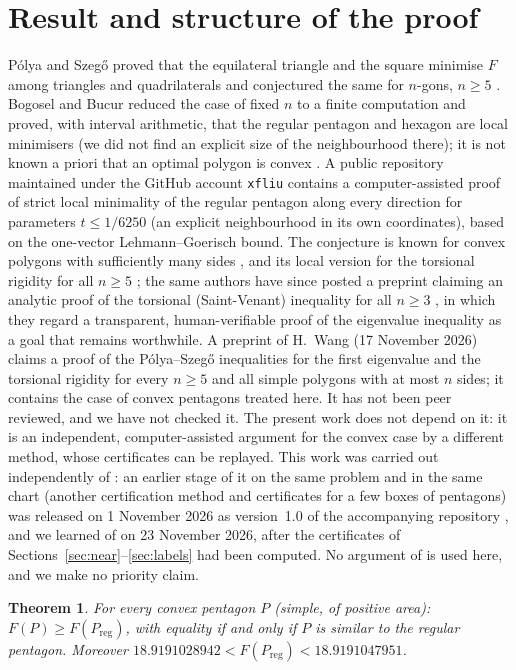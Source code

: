 \documentclass[11pt]{article}
\newtheorem{theorem}{Theorem}
\theoremstyle{remark}
\begin{document}
\section{Result and structure of the proof}
P\'olya and Szeg\H{o} proved that the equilateral triangle and the square minimise $F$ among triangles and
quadrilaterals and conjectured the same for $n$-gons, $n\ge5$ \cite{ps}. Bogosel and Bucur reduced the case of fixed
$n$ to a finite computation \cite{bb-jep} and proved, with interval arithmetic, that the regular pentagon and hexagon
are local minimisers \cite{bb-val} (we did not find an explicit size of the neighbourhood there); it is not known a priori that an optimal
polygon is convex \cite{bb-jep}. A public repository maintained under the GitHub account \texttt{xfliu} \cite{liu}
contains a computer-assisted proof of strict local minimality of the regular pentagon along every direction for
parameters $t\le1/6250$ (an explicit neighbourhood in its own coordinates), based on the one-vector Lehmann--Goerisch
bound. The conjecture is known for convex polygons with sufficiently many sides \cite{cghl}, and its local version for
the torsional rigidity for all $n\ge5$ \cite{bbf}; the same authors have since posted a preprint claiming an analytic proof of the
torsional (Saint-Venant) inequality for all $n\ge3$ \cite{bbf2}, in which they regard a transparent, human-verifiable
proof of the eigenvalue inequality as a goal that remains worthwhile. A preprint of H.~Wang \cite{wang} (17 November 2026) claims a proof of
the P\'olya--Szeg\H{o} inequalities for the first eigenvalue and the torsional rigidity for every $n\ge5$ and all simple
polygons with at most $n$ sides; it contains the case of convex pentagons treated here. It has
not been peer reviewed, and we have not checked it. The present work does not depend on it: it is an independent,
computer-assisted argument for the convex case by a different method, whose certificates can be replayed.
This work was carried out independently of \cite{wang}: an earlier stage of it on the same problem and in the same
chart (another certification method and certificates for a few boxes of pentagons) was released on 1 November 2026 as
version~1.0 of the accompanying repository \cite{v10}, and we learned of
\cite{wang} on 23 November 2026, after the certificates of Sections~\ref{sec:near}--\ref{sec:labels} had been
computed. No argument of \cite{wang} is used here, and we make no priority claim.

\begin{theorem}\label{thm:main}
For every convex pentagon $P$ (simple, of positive area): $F(P)\ge F(P_{\mathrm{reg}})$, with equality if and only if $P$
is similar to the regular pentagon.
Moreover $18.9191028942<F(P_{\mathrm{reg}})<18.9191047951$.
\end{theorem}
\end{document}
